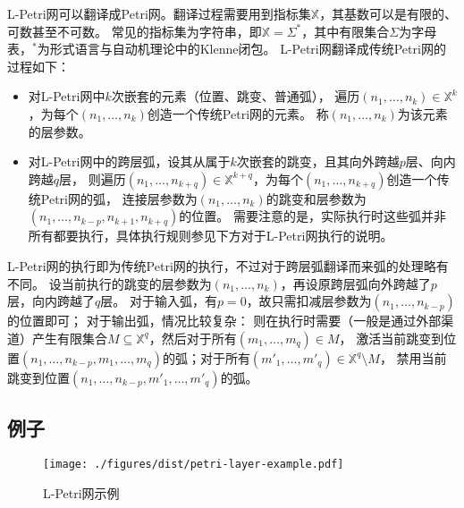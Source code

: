 \documentclass[index]{subfiles}
\begin{document}
L-Petri网可以翻译成Petri网。翻译过程需要用到指标集$\mathbb{X}$，其基数可以是有限的、可数甚至不可数。
常见的指标集为字符串，即$\mathbb{X}=\Sigma^*$，其中有限集合$\Sigma$为字母表，${}^*$为形式语言与自动机理论中的Klenne闭包。
L-Petri网翻译成传统Petri网的过程如下：
\begin{itemize}
  \item 对L-Petri网中$k$次嵌套的元素（位置、跳变、普通弧），
    遍历$\left(n_1,\ldots,n_k\right)\in\mathbb{X}^k$，为每个$\left(n_1,\ldots,n_k\right)$创造一个传统Petri网的元素。
    称$\left(n_1,\ldots,n_k\right)$为该元素的层参数。
  \item 对L-Petri网中的跨层弧，设其从属于$k$次嵌套的跳变，且其向外跨越$p$层、向内跨越$q$层，
    则遍历$\left(n_1,\ldots,n_{k+q}\right)\in\mathbb{X}^{k+q}$，为每个$\left(n_1,\ldots,n_{k+q}\right)$创造一个传统Petri网的弧，
    连接层参数为$\left(n_1,\ldots,n_k\right)$的跳变和层参数为$\left(n_1,\ldots,n_{k-p},n_{k+1},n_{k+q}\right)$的位置。
    需要注意的是，实际执行时这些弧并非所有都要执行，具体执行规则参见下方对于L-Petri网执行的说明。
\end{itemize}

L-Petri网的执行即为传统Petri网的执行，不过对于跨层弧翻译而来弧的处理略有不同。
设当前执行的跳变的层参数为$\left(n_1,\ldots,n_k\right)$，再设原跨层弧向外跨越了$p$层，向内跨越了$q$层。
对于输入弧，有$p=0$，故只需扣减层参数为$\left(n_1,\ldots,n_{k-p}\right)$的位置即可；
对于输出弧，情况比较复杂：
则在执行时需要（一般是通过外部渠道）产生有限集合$M\subseteq\mathbb{X}^{q}$，然后对于所有$\left(m_1,\ldots,m_q\right)\in{}M$，
激活当前跳变到位置$\left(n_1,\ldots,n_{k-p},m_1,\ldots,m_q\right)$的弧；对于所有$\left(m'_1,\ldots,m'_q\right)\in{}\mathbb{X}^{q}\setminus{}M$，
禁用当前跳变到位置$\left(n_1,\ldots,n_{k-p},m'_1,\ldots,m'_q\right)$的弧。

\subsection{例子}
\begin{figure}[h]
  \centering
  \texttt{[image: ./figures/dist/petri-layer-example.pdf]}
  \caption{L-Petri网示例\label{fig:petri-layer}}
\end{figure}
\end{document}
